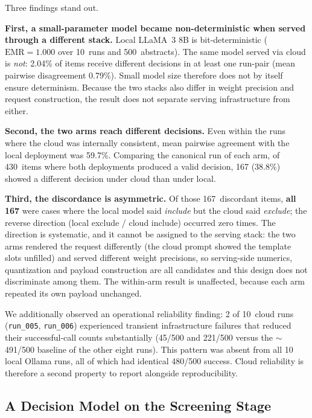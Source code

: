 \documentclass[preprint,review,12pt,authoryear]{elsarticle}
\newcommand{\emr}{\textrm{EMR}}
\begin{document}
\noindent Three findings stand out.

\textbf{First, a small-parameter model became non-deterministic when served through a different stack.}
Local LLaMA~3 8B is bit-deterministic ($\emr{=}1.000$ over 10~runs and 500~abstracts).
The same model served via cloud is \emph{not}: 2.04\% of items receive different decisions in at least one run-pair (mean pairwise disagreement 0.79\%).
Small model size therefore does not by itself ensure determinism. Because the two stacks also differ in weight precision and request construction, the result does not separate serving infrastructure from either.

\textbf{Second, the two arms reach different decisions.}
Even within the runs where the cloud was internally consistent, mean pairwise agreement with the local deployment was 59.7\%.
Comparing the canonical run of each arm, of 430~items where both deployments produced a valid decision, 167 (38.8\%) showed a different decision under cloud than under local.

\textbf{Third, the discordance is asymmetric.}
Of those 167~discordant items, \textbf{all 167} were cases where the local model said \emph{include} but the cloud said \emph{exclude}; the reverse direction (local exclude / cloud include) occurred zero times.
The direction is systematic, and it cannot be assigned to the serving stack: the two arms rendered the request differently (the cloud prompt showed the template slots unfilled) and served different weight precisions, so serving-side numerics, quantization and payload construction are all candidates and this design does not discriminate among them. The within-arm result is unaffected, because each arm repeated its own payload unchanged.

We additionally observed an operational reliability finding: 2 of 10~cloud runs (\texttt{run\_005}, \texttt{run\_006}) experienced transient infrastructure failures that reduced their successful-call counts substantially (45/500 and 221/500 versus the ${\sim}$491/500 baseline of the other eight runs).
This pattern was absent from all 10 local Ollama runs, all of which had identical 480/500 success.
Cloud reliability is therefore a second property to report alongside reproducibility.

\subsection{A Decision Model on the Screening Stage}
\label{sec:jev}
\end{document}

